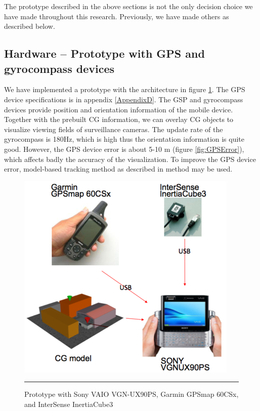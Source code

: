 The prototype described in the above sections is not the only decision choice we have made throughout this research. Previously, we have made others as described below.

\subsection{Hardware -- Prototype with GPS and gyrocompass devices}

We have implemented a prototype with the architecture in figure \ref{fig:VAIOGPSGyro}. The GPS device specifications is in appendix \ref{AppendixD}. The GSP and gyrocompass devices provide position and orientation information of the mobile device. Together with the prebuilt CG information, we can overlay CG objects to visualize viewing fields of surveillance cameras. The update rate of the gyrocompass is 180Hz, which is high thus the orientation information is quite good. However, the GPS device error is about 5-10 m (figure \ref{fig:GPSError}), which affects badly the accuracy of the visualization. To improve the GPS device error, model-based tracking method as described in \citep{Reference13} method may be used.

\begin{figure}[htbp]
	\centering
	\includegraphics{./Primitives/vaio_gps_gyro.png}
	\rule{35em}{0.5pt}
	\caption[Prototype with GPS and gyrocompass devices]{Prototype with Sony VAIO VGN-UX90PS, Garmin GPSmap 60CSx, and InterSense InertiaCube3}
	\label{fig:VAIOGPSGyro}
\end{figure}

